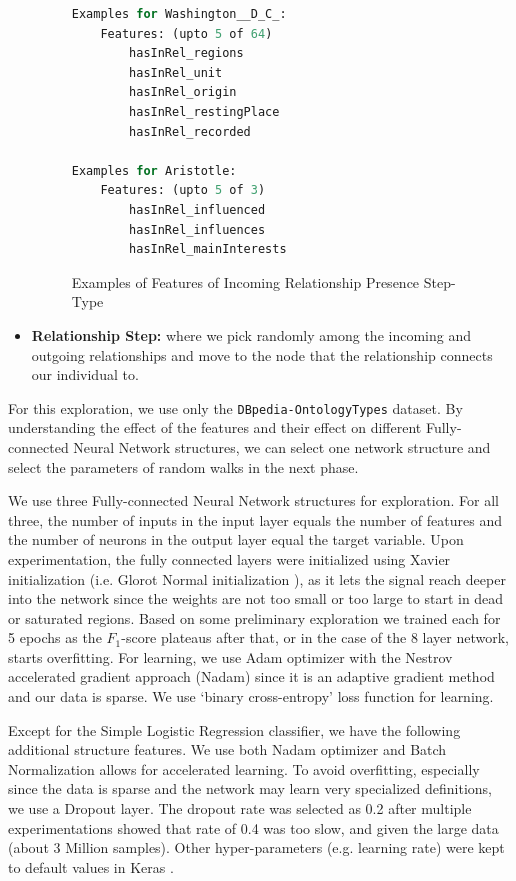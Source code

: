 \documentclass[runningheads,a4paper]{IEEEtran}
\begin{document}
\begin{itemize}
\begin{figure}[t]
\begin{lstlisting}[language=Python,basicstyle=\tiny, frame=single]
Examples for Washington__D_C_: 
	Features: (upto 5 of 64)
		hasInRel_regions
		hasInRel_unit
		hasInRel_origin
		hasInRel_restingPlace
		hasInRel_recorded

Examples for Aristotle: 
	Features: (upto 5 of 3)
		hasInRel_influenced
		hasInRel_influences
		hasInRel_mainInterests
\end{lstlisting}
\caption{Examples of Features of Incoming Relationship Presence Step-Type}
\label{inRelExamples}
\end{figure}

     \item \textbf{Relationship Step:} where we pick randomly among the incoming and outgoing relationships and move to the node that the relationship connects our individual to. 
  \end{itemize}



For this exploration, we use only the \texttt{DBpedia-OntologyTypes} dataset. By understanding the effect of the features and their effect on different Fully-connected Neural Network structures, we can select one network structure and select the parameters of random walks in the next phase. 

We use three Fully-connected Neural Network structures for exploration. For all three, the number of inputs in the input layer equals the number of features and the number of neurons in the output layer equal the target variable. Upon experimentation, the fully connected layers were initialized using Xavier initialization (i.e. Glorot Normal initialization \cite{glorot2010understanding}), as it lets the signal reach deeper into the network since the weights are not too small or too large to start in dead or saturated regions. Based on some preliminary exploration we trained each for 5 epochs as the $F_1$-score plateaus after that, or in the case of the 8 layer network, starts overfitting. For learning, we use Adam optimizer with the Nestrov accelerated gradient approach \cite{dozat2015incorporating} (Nadam) since it is an adaptive gradient method and our data is sparse. We use `binary cross-entropy' loss function for learning. 

Except for the Simple Logistic Regression classifier, we have the following additional structure features. We use both Nadam optimizer and Batch Normalization allows for accelerated learning. To avoid overfitting, especially since the data is sparse and the network may learn very specialized definitions, we use a Dropout layer. The dropout rate was selected as 0.2 after multiple experimentations showed that rate of 0.4 was too slow, and given the large data (about 3 Million samples). Other hyper-parameters (e.g. learning rate) were kept to default values in Keras \cite{chollet2015keras}.
\end{document}
